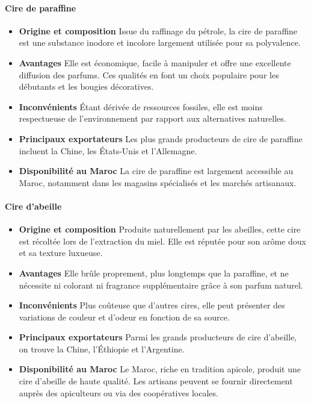 \documentclass[11pt,fleqn,onecolumn,oneside]{book}
\begin{document}
\paragraph{Cire de paraffine}
\begin{itemize}
    \item \textbf{Origine et composition} Issue du raffinage du pétrole, la cire de paraffine est une substance inodore et incolore largement utilisée pour sa polyvalence.
    \item \textbf{Avantages} Elle est économique, facile à manipuler et offre une excellente diffusion des parfums. Ces qualités en font un choix populaire pour les débutants et les bougies décoratives.
    \item \textbf{Inconvénients} Étant dérivée de ressources fossiles, elle est moins respectueuse de l’environnement par rapport aux alternatives naturelles.
    \item \textbf{Principaux exportateurs} Les plus grands producteurs de cire de paraffine incluent la Chine, les États-Unis et l’Allemagne.
    \item \textbf{Disponibilité au Maroc} La cire de paraffine est largement accessible au Maroc, notamment dans les magasins spécialisés et les marchés artisanaux.
\end{itemize}

\paragraph{Cire d’abeille}
\begin{itemize}
    \item \textbf{Origine et composition} Produite naturellement par les abeilles, cette cire est récoltée lors de l’extraction du miel. Elle est réputée pour son arôme doux et sa texture luxueuse.
    \item \textbf{Avantages} Elle brûle proprement, plus longtemps que la paraffine, et ne nécessite ni colorant ni fragrance supplémentaire grâce à son parfum naturel.
    \item \textbf{Inconvénients} Plus coûteuse que d’autres cires, elle peut présenter des variations de couleur et d’odeur en fonction de sa source.
    \item \textbf{Principaux exportateurs} Parmi les grands producteurs de cire d’abeille, on trouve la Chine, l’Éthiopie et l’Argentine.
    \item \textbf{Disponibilité au Maroc} Le Maroc, riche en tradition apicole, produit une cire d’abeille de haute qualité. Les artisans peuvent se fournir directement auprès des apiculteurs ou via des coopératives locales.
\end{itemize}
\end{document}
